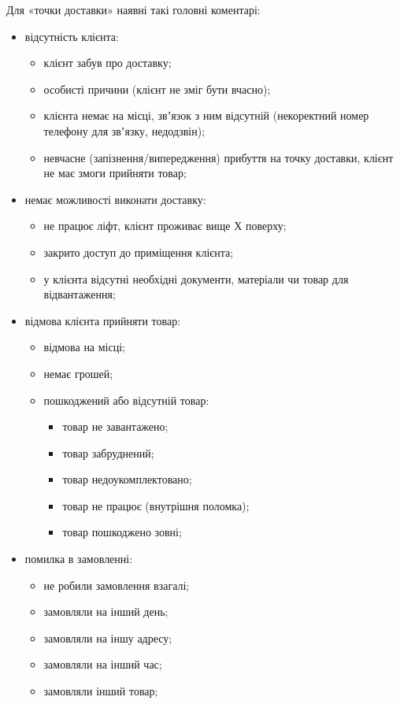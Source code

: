 Для «точки доставки» наявні такі головні коментарі:
\begin{itemize}
	\item відсутність клієнта:
	\begin{itemize}
		\item клієнт забув про доставку;
		\item особисті причини (клієнт не зміг бути вчасно);
		\item клієнта немає на місці, звʼязок з ним відсутній (некоректний номер телефону для звʼязку, недодзвін);
		\item невчасне (запізнення/випередження) прибуття на точку доставки, клієнт не має змоги прийняти товар;
	\end{itemize}
	\item немає можливості виконати доставку:
	\begin{itemize}
		\item не працює ліфт, клієнт проживає вище Х поверху;
		\item закрито доступ до приміщення клієнта;
		\item у клієнта відсутні необхідні документи, матеріали чи товар для відвантаження;
	\end{itemize}
	\item відмова клієнта прийняти товар:
	\begin{itemize}
		\item відмова на місці;
		\item немає грошей;
		\item пошкоджений або відсутній товар:
		\begin{itemize}
			\item товар не завантажено;
			\item товар забруднений;
			\item товар недоукомплектовано;
			\item товар не працює (внутрішня поломка);
			\item товар пошкоджено зовні;
		\end{itemize}
	\end{itemize}
	\item помилка в замовленні:
	\begin{itemize}
		\item не робили замовлення взагалі;
		\item замовляли на інший день;
		\item замовляли на іншу адресу;
		\item замовляли на інший час;
		\item замовляли інший товар;

\end{itemize}
\end{itemize}

